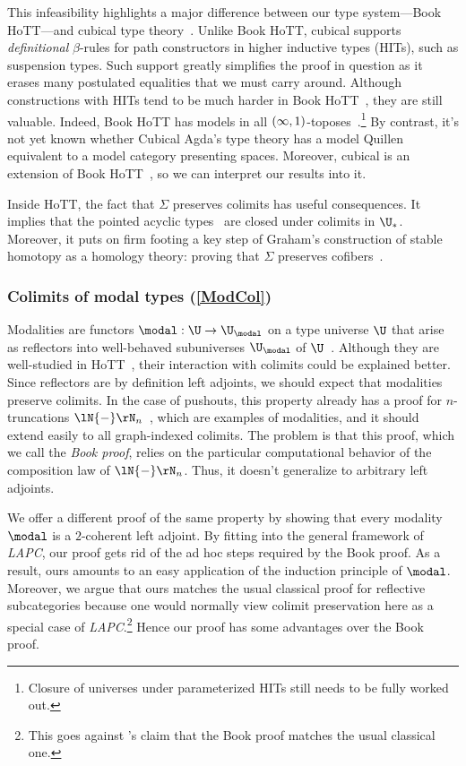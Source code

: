 This infeasibility highlights a major difference between our type system---Book HoTT---and cubical type theory~\cite{cubagda}. Unlike Book HoTT, cubical supports \emph{definitional} $\beta$-rules for path constructors in higher inductive types (HITs), such as suspension types. Such support greatly simplifies the proof in question as it erases many postulated equalities that we must carry around.  Although constructions with HITs tend to be much harder in Book HoTT~\cite{cubsyn}, they are still valuable. Indeed, Book HoTT has models in all $\mleft(\infty,1\mright)$-toposes~\cite{HITsem, topoimod}.\footnote{Closure of universes under parameterized HITs still needs to be fully worked out.} By contrast, it's not yet known whether Cubical Agda's type theory has a model Quillen equivalent to a model category presenting spaces. Moreover, cubical is an extension of Book HoTT~\cite[Section 2.16]{ABCHFL}, so we can interpret our results into it.

Inside HoTT, the fact that $\Sigma$ preserves colimits has useful consequences. It implies that the pointed acyclic types~\cite{acyclic} are closed under colimits in $\U_{\ast}$. Moreover, it puts on firm footing a key step of Graham's construction of stable homotopy as a homology theory: proving that $\Sigma$ preserves cofibers~\cite[Corollary 2.2]{graham}. 

\subsubsection{Colimits of modal types (\autoref{ModCol})} \label{modsum}

Modalities are functors $\modal : \U \to \U_{\modal}$ on a type universe $\U$ that arise as reflectors into well-behaved subuniverses $\U_{\modal}$ of $\U$~\cite{RS}. Although they are well-studied in HoTT~\cite{modaldes, modalchar}, their interaction with colimits could be explained better. Since reflectors are by definition left adjoints, we should expect that modalities preserve colimits.
In the case of pushouts, this property already has a proof for $n$-truncations $\lN{-}\rN_n$~\cite[Section 7.4]{Uni13}, which are examples of modalities, and it should extend easily to all graph-indexed colimits. The problem is that this proof, which we call the \emph{Book proof}, relies on the particular computational behavior of the composition law of $\lN{-}\rN_n$. Thus, it doesn't generalize to arbitrary left adjoints.

We offer a different proof of the same property by showing that every modality $\modal$ is a $2$-coherent left adjoint. By fitting into the general framework of \emph{LAPC}, our proof gets rid of the ad hoc steps required by the Book proof. As a result, ours  amounts to an easy application of the induction principle of $\modal$. Moreover, we argue that ours matches the usual classical proof for reflective subcategories because one would normally view colimit preservation here as a special case of \emph{LAPC}.\footnote{This goes against \cite[Section 7.7]{Uni13}'s claim that the Book proof matches the usual classical one.} Hence our proof has some advantages over the Book proof.

